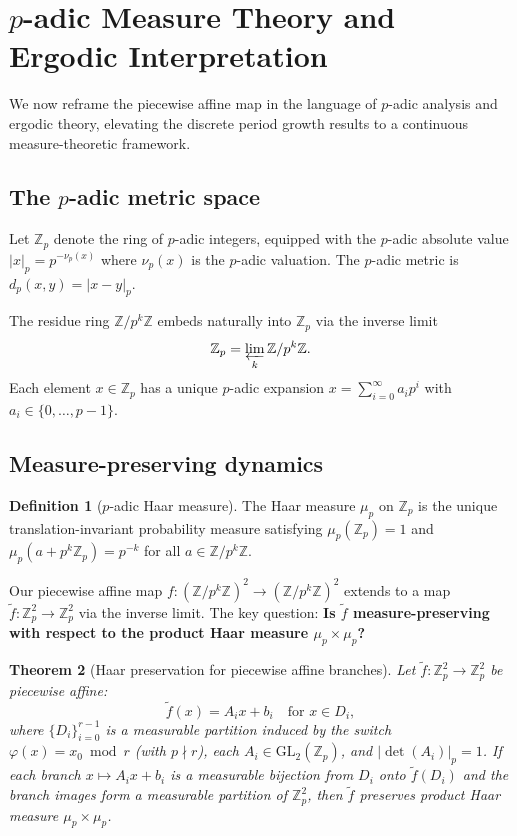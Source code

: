 \documentclass[11pt]{article}
\theoremstyle{plain}
\newtheorem{theorem}{Theorem}[section]
\theoremstyle{definition}
\newtheorem{definition}[theorem]{Definition}
\newcommand{\Z}{\mathbb{Z}}
\newcommand{\vp}{\nu_p}
\newcommand{\absp}[1]{\lvert #1 \rvert_p}
\newcommand{\GL}{\mathrm{GL}}
\begin{document}
\section{$p$-adic Measure Theory and Ergodic Interpretation}
\label{sec:padic_measure}

We now reframe the piecewise affine map in the language of $p$-adic analysis and ergodic theory, elevating the discrete period growth results to a continuous measure-theoretic framework.

\subsection{The $p$-adic metric space}

Let $\Z_p$ denote the ring of $p$-adic integers, equipped with the $p$-adic absolute value $\absp{x} = p^{-\vp(x)}$ where $\vp(x)$ is the $p$-adic valuation. The $p$-adic metric is $d_p(x,y) = \absp{x-y}$.

The residue ring $\Z/p^k\Z$ embeds naturally into $\Z_p$ via the inverse limit
\begin{equation}
\Z_p = \varprojlim_{k} \Z/p^k\Z.
\end{equation}
Each element $x \in \Z_p$ has a unique $p$-adic expansion $x = \sum_{i=0}^{\infty} a_i p^i$ with $a_i \in \{0,\ldots,p-1\}$.

\subsection{Measure-preserving dynamics}

\begin{definition}[$p$-adic Haar measure]
The Haar measure $\mu_p$ on $\Z_p$ is the unique translation-invariant probability measure satisfying $\mu_p(\Z_p) = 1$ and $\mu_p(a + p^k \Z_p) = p^{-k}$ for all $a \in \Z/p^k\Z$.
\end{definition}

Our piecewise affine map $f\colon (\Z/p^k\Z)^2 \to (\Z/p^k\Z)^2$ extends to a map $\tilde{f}\colon \Z_p^2 \to \Z_p^2$ via the inverse limit. The key question: \textbf{Is $\tilde{f}$ measure-preserving with respect to the product Haar measure $\mu_p \times \mu_p$?}

\begin{theorem}[Haar preservation for piecewise affine branches]
\label{thm:measure_preserving}
Let $\tilde f\colon \Z_p^2\to\Z_p^2$ be piecewise affine:
\[
\tilde f(x)=A_i x+b_i \quad \text{for }x\in D_i,
\]
where $\{D_i\}_{i=0}^{r-1}$ is a measurable partition induced by the switch $\varphi(x)=x_0\bmod r$ (with $p\nmid r$), each $A_i\in \GL_2(\Z_p)$, and $|\det(A_i)|_p=1$. If each branch $x\mapsto A_i x+b_i$ is a measurable bijection from $D_i$ onto $\tilde f(D_i)$ and the branch images form a measurable partition of $\Z_p^2$, then $\tilde f$ preserves product Haar measure $\mu_p\times\mu_p$.
\end{theorem}
\end{document}
